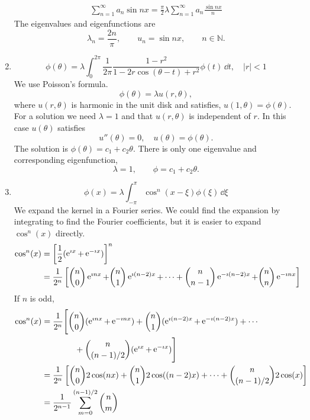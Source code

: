 \begin{Solution}
\begin{enumerate}
\begin{gather*}
      \sum_{n = 1}^\infty a_n \sin n x 
      = \frac{\pi}{2} \lambda \sum_{n = 1}^\infty a_n \frac{ \sin n x }{ n } 
    \end{gather*}
    The eigenvalues and eigenfunctions are
    \[
    \boxed{
      \lambda_n = \frac{ 2 n }{ \pi }, \qquad
      u_n = \sin n x, \qquad
      n \in \mathbb{N}.
      }
    \]
  \item
    \[
    \phi(\theta) = \lambda \int_0^{2 \pi} \frac{1}{2 \pi} \frac{ 1 - r^2 }
    { 1 - 2 r \cos (\theta - t) + r^2 } \phi(t) \,\dd t, \quad
    |r| < 1
    \]
    We use Poisson's formula.
    \[
    \phi(\theta) = \lambda u(r,\theta),
    \]
    where $u(r,\theta)$ is harmonic in the unit disk and satisfies,
    $u(1, \theta) = \phi(\theta)$.  For a solution we need $\lambda = 1$
    and that $u(r,\theta)$ is independent of $r$.  In this case $u(\theta)$
    satisfies
    \[
    u''(\theta) = 0, \quad u(\theta) = \phi(\theta).
    \]
    The solution is $\phi(\theta) = c_1 + c_2 \theta$.
    There is only one eigenvalue and corresponding eigenfunction,
    \[
    \boxed{
      \lambda = 1, \qquad \phi = c_1 + c_2 \theta.
      }
    \]
  \item
    \[
    \phi(x) = \lambda \int_{-\pi}^\pi \cos^n (x - \xi) \phi(\xi) \,\dd \xi
    \]
    We expand the kernel in a Fourier series.
    We could find the expansion by integrating to find the Fourier
    coefficients, but it is easier to expand $\cos^n(x)$ directly.
    \begin{align*}
      \cos^n(x)
      &= \left[ \frac{1}{2} (\mathop{\mathrm{e}}\nolimits^{\imath x} + \mathop{\mathrm{e}}\nolimits^{-\imath x}) \right]^n \\
      &= \frac{1}{2^n} \left[ \binom{n}{0} \mathop{\mathrm{e}}\nolimits^{\imath n x} +
        \binom{n}{1} \mathop{\mathrm{e}}\nolimits^{\imath (n-2)x} + \cdots +
        \binom{n}{n-1} \mathop{\mathrm{e}}\nolimits^{-\imath (n-2)x} + \binom{n}{n} \mathop{\mathrm{e}}\nolimits^{-\imath n x} \right]
    \end{align*}
    If $n$ is odd,
    \begin{align*}
      \cos^n(x)
      &= \frac{1}{2^n} \Bigg[ \binom{n}{0} (\e^{\imath n x} + \e^{-\imath n x})
      + \binom{n}{1} (\e^{\imath (n-2)x} + \e^{-\imath (n-2)x}) + \cdots \\
      &\qquad\qquad + \binom{n}{(n-1)/2}(\e^{\imath x} + \e^{-\imath x}) \Bigg] \\
      &= \frac{1}{2^n} \left[ \binom{n}{0} 2 \cos(n x)
        + \binom{n}{1} 2 \cos((n-2)x) + \cdots +
        \binom{n}{(n-1)/2}2\cos(x) \right] \\
      &= \frac{1}{2^{n-1}} \sum_{m=0}^{(n-1)/2} \binom{n}{m}

\end{align*}
\end{enumerate}
\end{Solution}
